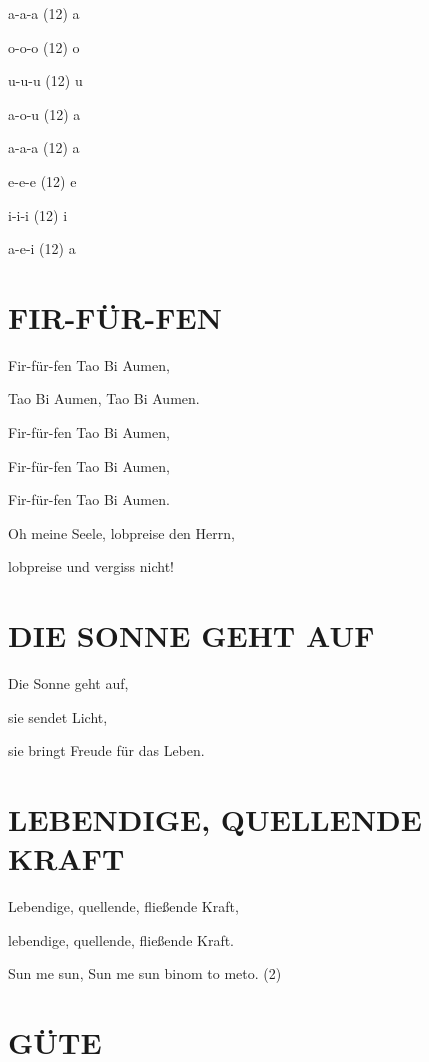 \documentclass[11pt,a5paper,twoside]{article}
\begin{document}
a-a-a (12) a

o-o-o (12) o

u-u-u (12) u

a-o-u (12) a

a-a-a (12) a

e-e-e (12) e

i-i-i (12) i

a-e-i (12) a

\newpage


\section[Fir-für-fen]{FIR-FÜR-FEN}





Fir-für-fen Tao Bi Aumen,

Tao Bi Aumen, Tao Bi Aumen.

Fir-für-fen Tao Bi Aumen,

Fir-für-fen Tao Bi Aumen,

Fir-für-fen Tao Bi Aumen.

Oh meine Seele, lobpreise den Herrn, 

lobpreise und vergiss nicht!





\section[Die Sonne geht auf]{DIE SONNE GEHT AUF}



Die Sonne geht auf, 

sie sendet Licht,

sie bringt Freude für das Leben.





\section[Lebendige, quellenden Kraft]{LEBENDIGE, QUELLENDE KRAFT}


Lebendige, quellende, fließende Kraft, 

lebendige, quellende, fließende Kraft. 

Sun me sun, Sun me sun binom to meto. (2) 






\section[Güte]{GÜTE}
\end{document}
